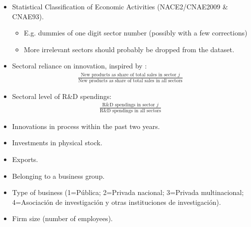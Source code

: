 \begin{itemize}
  \item	Statistical Classification of Economic Activities (NACE2/CNAE2009 \& CNAE93).
  \begin{itemize}
    \item E.g. dummies of one digit sector number (possibly with a few corrections)
    \item More irrelevant sectors should probably be dropped from the dataset.
  \end{itemize}
  \item Sectoral reliance on innovation, inspired by \citet{barrios2001explaining}:
  \begin{align*}
    \frac{\text{New products as share of total sales in sector }j}{\text{New products as share of total sales in all sectors}}
  \end{align*}
  \item Sectoral level of R\&D spendings:
  \begin{align*}
    \frac{\text{R\&D spendings in sector }j}{\text{R\&D spendings in all sectors}}
  \end{align*}
  \item Innovations in process within the past two years.
  \item	Investments in physical stock.
  \item	Exports.
  \item	Belonging to a business group.
  \item	Type of business (1=Pública; 2=Privada nacional; 3=Privada multinacional; 4=Asociación de investigación y otras instituciones de investigación).
  \item	Firm size (number of employees).
\end{itemize}
